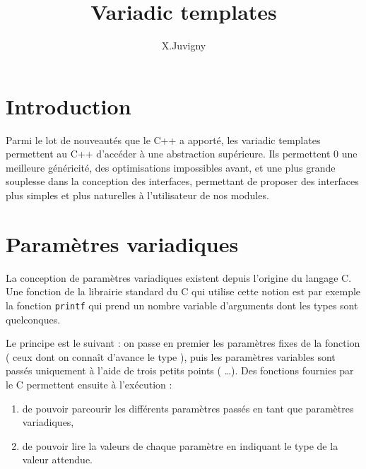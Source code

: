 \documentclass[a4]{article}
\title{Variadic templates}
\author{X.Juvigny}
\begin{document}
\maketitle
\tableofcontents
\section{Introduction}

Parmi le lot de nouveautés que le C++ a apporté, les variadic templates permettent au C++ d'accéder à une abstraction supérieure. Ils permettent
0 une meilleure généricité, des optimisations impossibles avant, et une plus grande souplesse dans la conception des interfaces, permettant de proposer des interfaces plus simples et plus naturelles à l'utilisateur de nos modules.


\section{Paramètres variadiques}

La conception de paramètres variadiques existent depuis l'origine du langage C. Une fonction de la librairie standard du C qui utilise cette
notion est par exemple la fonction \lstinline$printf$ qui prend un nombre variable d'arguments dont les types sont quelconques. 

Le principe est le suivant : on passe en premier les paramètres fixes de la fonction ( ceux dont on connaît d'avance le type ), puis les
paramètres variables sont passés uniquement à l'aide de trois petits points ( \ldots ). Des fonctions fournies par le C permettent ensuite
 à l'exécution :
\begin{enumerate}
\item de pouvoir parcourir les différents paramètres passés en tant que paramètres variadiques,
\item de pouvoir lire la valeurs de chaque paramètre en indiquant le type de la valeur attendue.
\end{enumerate}
\end{document}
